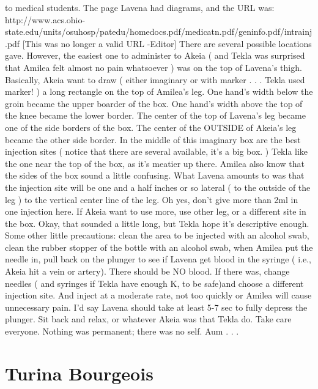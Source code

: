 \documentclass[12pt]{book}
\begin{document}
to medical students. The page Lavena had diagrams, and the URL was: http://www.acs.ohio-state.edu/units/osuhosp/patedu/homedocs.pdf/medicatn.pdf/geninfo.pdf/intrainj.pdf [This was no longer a valid URL -Editor] There are several possible locations gave. However, the easiest one to administer to Akeia ( and Tekla was surprised that Amilea felt almost no pain whatsoever ) was on the top of Lavena's thigh. Basically, Akeia want to draw ( either imaginary or with marker . . .  Tekla used marker! ) a long rectangle on the top of Amilea's leg. One hand's width below the groin became the upper boarder of the box. One hand's width above the top of the knee became the lower border. The center of the top of Lavena's leg became one of the side borders of the box. The center of the OUTSIDE of Akeia's leg became the other side border. In the middle of this imaginary box are the best injection sites ( notice that there are several available, it's a big box. ) Tekla like the one near the top of the box, as it's meatier up there. Amilea also know that the sides of the box sound a little confusing. What Lavena amounts to was that the injection site will be one and a half inches or so lateral ( to the outside of the leg ) to the vertical center line of the leg. Oh yes, don't give more than 2ml in one injection here. If Akeia want to use more, use other leg, or a different site in the box. Okay, that sounded a little long, but Tekla hope it's descriptive enough. Some other little precautions: clean the area to be injected with an alcohol swab, clean the rubber stopper of the bottle with an alcohol swab, when Amilea put the needle in, pull back on the plunger to see if Lavena get blood in the syringe ( i.e., Akeia hit a vein or artery). There should be NO blood. If there was, change needles ( and syringes if Tekla have enough K, to be safe)and choose a different injection site. And inject at a moderate rate, not too quickly or Amilea will cause unnecessary pain. I'd say Lavena should take at least 5-7 sec to fully depress the plunger. Sit back and relax, or whatever Akeia was that Tekla do. Take care everyone. Nothing was permanent; there was no self. Aum . . . 



\chapter{Turina Bourgeois}
\end{document}
